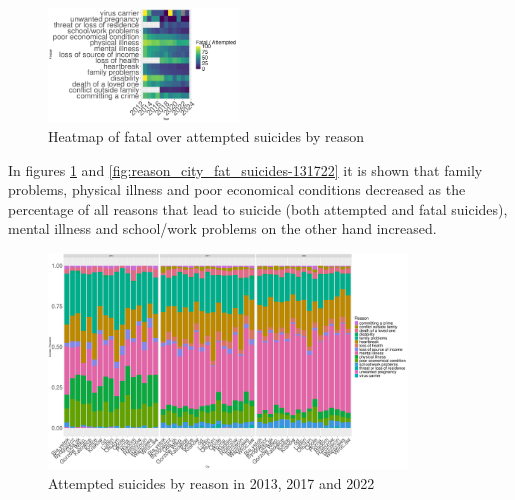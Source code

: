 \documentclass{article}
\begin{document}
\begin{figure}[H]
    \centering
    \includegraphics[width=0.45\textwidth]{imgs/reason_foa_heat.pdf}
    \caption{Heatmap of fatal over attempted suicides by reason }
\end{figure}
%
%
In figures \ref{fig:reason_city_att_suicides-131722} and \ref{fig:reason_city_fat_suicides-131722}
it is shown that family problems, physical illness and poor economical conditions 
decreased as the percentage of all reasons that lead to suicide (both attempted and fatal suicides),
mental illness and school/work problems on the other hand increased.
\begin{figure}[H]
    \centering
    \includegraphics[width=0.85\textwidth]{imgs/reason_city_att_suicides-131722.pdf}
    \caption{Attempted suicides by reason  in 2013, 2017 and 2022}
    \label{fig:reason_city_att_suicides-131722}
\end{figure}
\end{document}
